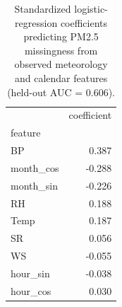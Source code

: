 \begin{table}
\caption{Standardized logistic-regression coefficients predicting PM2.5 missingness from observed meteorology and calendar features (held-out AUC = 0.606).}
\label{tab:mar_logistic}
\begin{tabular}{lr}
\toprule
 & coefficient \\
feature &  \\
\midrule
BP & 0.387 \\
month\_cos & -0.288 \\
month\_sin & -0.226 \\
RH & 0.188 \\
Temp & 0.187 \\
SR & 0.056 \\
WS & -0.055 \\
hour\_sin & -0.038 \\
hour\_cos & 0.030 \\
\bottomrule
\end{tabular}
\end{table}

